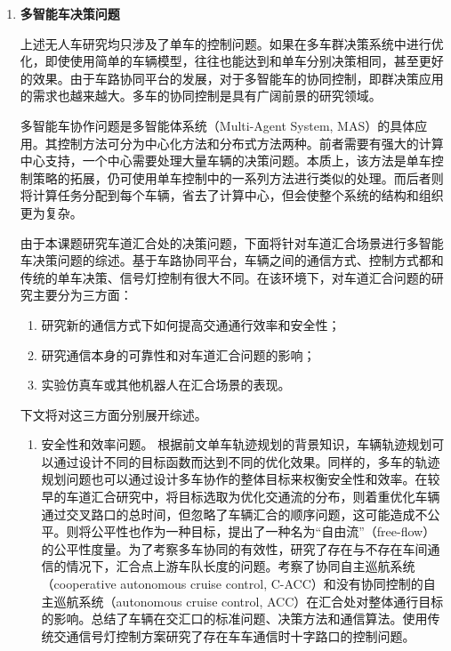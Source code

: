\begin{enumerate}[wide=\parindent]
\item \textbf{多智能车决策问题}
\label{sec:multi}

上述无人车研究均只涉及了单车的控制问题。如果在多车群决策系统中进行优化，即使使用简单的车辆模型，往往也能达到和单车分别决策相同，甚至更好的效果\cite{Cao2012An}。由于车路协同平台的发展，对于多智能车的协同控制，即群决策应用的需求也越来越大。多车的协同控制是具有广阔前景的研究领域。

多智能车协作问题是多智能体系统（Multi-Agent System, MAS）的具体应用。其控制方法可分为中心化方法和分布式方法两种。前者需要有强大的计算中心支持，一个中心需要处理大量车辆的决策问题。本质上，该方法是单车控制策略的拓展，仍可使用单车控制中的一系列方法进行类似的处理。而后者则将计算任务分配到每个车辆，省去了计算中心，但会使整个系统的结构和组织更为复杂。

由于本课题研究车道汇合处的决策问题，下面将针对车道汇合场景进行多智能车决策问题的综述。基于车路协同平台，车辆之间的通信方式、控制方式都和传统的单车决策、信号灯控制有很大不同。在该环境下，对车道汇合问题的研究主要分为三方面：

\begin{enumerate}[label=(\arabic*),wide=\parindent]
\item 研究新的通信方式下如何提高交通通行效率和安全性；
\item 研究通信本身的可靠性和对车道汇合问题的影响；
\item 实验仿真车或其他机器人在汇合场景的表现。
\end{enumerate}

下文将对这三方面分别展开综述。


\begin{enumerate}[label=(\arabic*),wide=\parindent]
\item 安全性和效率问题。
根据前文单车轨迹规划的背景知识，车辆轨迹规划可以通过设计不同的目标函数而达到不同的优化效果。同样的，多车的轨迹规划问题也可以通过设计多车协作的整体目标来权衡安全性和效率。在较早的车道汇合研究中，将目标选取为优化交通流的分布，则着重优化车辆通过交叉路口的总时间，但忽略了车辆汇合的顺序问题，这可能造成不公平。则将公平性也作为一种目标，提出了一种名为“自由流”（free-flow）的公平性度量。为了考察多车协同的有效性，研究了存在与不存在车间通信的情况下，汇合点上游车队长度的问题。考察了协同自主巡航系统（cooperative autonomous cruise control, C-ACC）和没有协同控制的自主巡航系统（autonomous cruise control, ACC）在汇合处对整体通行目标的影响。总结了车辆在交汇口的标准问题、决策方法和通信算法。\cite{Gradinescu2007Adaptive}使用传统交通信号灯控制方案研究了存在车车通信时十字路口的控制问题。


\end{enumerate}
\end{enumerate}
